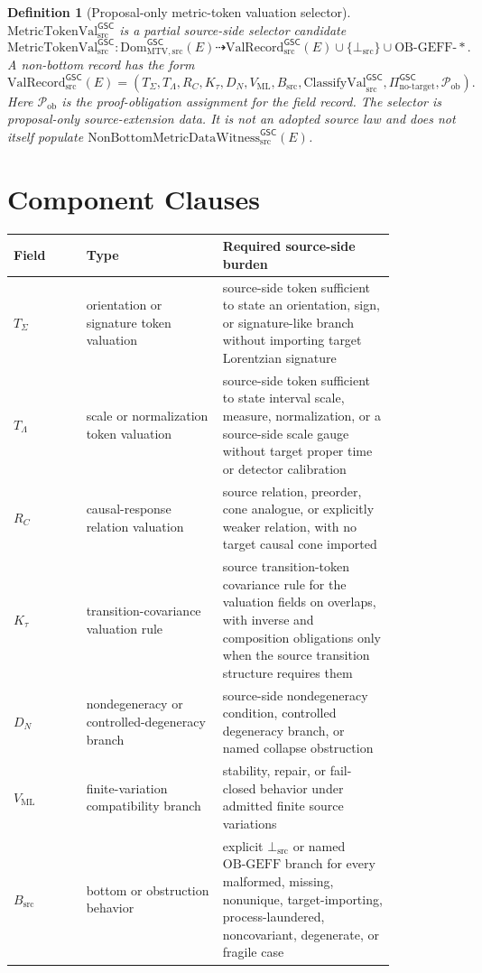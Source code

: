 \documentclass[11pt]{article}
\newcommand{\MetricTokenVal}{\mathrm{MetricTokenVal}_{\mathrm{src}}^{\mathsf{GSC}}}
\newcommand{\DomMTV}{\mathrm{Dom}_{\mathrm{MTV,src}}^{\mathsf{GSC}}}
\newcommand{\ValRecord}{\mathrm{ValRecord}_{\mathrm{src}}^{\mathsf{GSC}}}
\newcommand{\Witness}{\mathrm{NonBottomMetricDataWitness}_{\mathrm{src}}^{\mathsf{GSC}}}
\newcommand{\BottomSrc}{\bot_{\mathrm{src}}}
\newcommand{\ClassVal}{\mathrm{ClassifyVal}_{\mathrm{src}}^{\mathsf{GSC}}}
\newcommand{\NoTarget}{\Pi_{\mathrm{no\mbox{-}target}}^{\mathsf{GSC}}}
\newtheorem{definition}{Definition}
\begin{document}
\begin{definition}[Proposal-only metric-token valuation selector]
\(\MetricTokenVal\) is a partial source-side selector candidate
\[
  \MetricTokenVal:
  \DomMTV(E)
  \dashrightarrow
  \ValRecord(E)
  \cup
  \{\BottomSrc\}
  \cup
  \mathrm{OB\mbox{-}GEFF\mbox{-}*}.
\]
A non-bottom record has the form
\[
  \ValRecord(E)
  =
  (
    T_{\Sigma},
    T_{\Lambda},
    R_C,
    K_{\tau},
    D_N,
    V_{\mathrm{ML}},
    B_{\mathrm{src}},
    \ClassVal,
    \NoTarget,
    \mathcal{P}_{\mathrm{ob}}
  ).
\]
Here \(\mathcal{P}_{\mathrm{ob}}\) is the proof-obligation assignment for the
field record. The selector is proposal-only source-extension data. It is not
an adopted source law and does not itself populate \(\Witness(E)\).
\end{definition}

\section{Component Clauses}

\begin{longtable}{p{0.16\linewidth}p{0.30\linewidth}p{0.38\linewidth}}
\toprule
Field & Type & Required source-side burden \\
\midrule
\(T_{\Sigma}\) &
orientation or signature token valuation &
source-side token sufficient to state an orientation, sign, or signature-like
branch without importing target Lorentzian signature \\
\(T_{\Lambda}\) &
scale or normalization token valuation &
source-side token sufficient to state interval scale, measure, normalization,
or a source-side scale gauge without target proper time or detector
calibration \\
\(R_C\) &
causal-response relation valuation &
source relation, preorder, cone analogue, or explicitly weaker relation,
with no target causal cone imported \\
\(K_{\tau}\) &
transition-covariance valuation rule &
source transition-token covariance rule for the valuation fields on overlaps,
with inverse and composition obligations only when the source transition
structure requires them \\
\(D_N\) &
nondegeneracy or controlled-degeneracy branch &
source-side nondegeneracy condition, controlled degeneracy branch, or named
collapse obstruction \\
\(V_{\mathrm{ML}}\) &
finite-variation compatibility branch &
stability, repair, or fail-closed behavior under admitted finite source
variations \\
\(B_{\mathrm{src}}\) &
bottom or obstruction behavior &
explicit \(\BottomSrc\) or named \(\mathrm{OB\mbox{-}GEFF}\) branch for every
malformed, missing, nonunique, target-importing, process-laundered,
noncovariant, degenerate, or fragile case \\
\bottomrule
\end{longtable}
\end{document}
